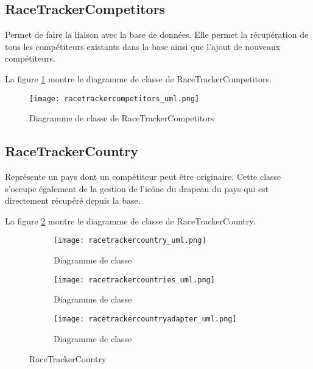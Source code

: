 \subsection{RaceTrackerCompetitors}

Permet de faire la liaison avec la base de données. Elle permet la récupération de tous les compétiteurs existants dans la base ainsi que l'ajout de nouveaux compétiteurs.

La figure \ref{fig:racetrackercompetitors_uml} montre le diagramme de classe de RaceTrackerCompetitors.

\begin{figure}[htb]
\centering 
\texttt{[image: racetrackercompetitors\_uml.png]} 
\caption{Diagramme de classe de RaceTrackerCompetitors}
\label{fig:racetrackercompetitors_uml}
 \end{figure}

\subsection{RaceTrackerCountry}

Représente un pays dont un compétiteur peut être originaire. Cette classe s'occupe également de la gestion de l'icône du drapeau du pays qui est directement récupéré depuis la base.

La figure \ref{fig:racetrackercountry_uml} montre le diagramme de classe de RaceTrackerCountry.

\begin{figure}[htb!]
    \centering
    \begin{subfigure}[htb]{1\textwidth}
		\texttt{[image: racetrackercountry\_uml.png]} 
		\caption{Diagramme de classe}
		\label{fig:racetrackercountry_uml}
    \end{subfigure}
    \begin{subfigure}[htb]{1\textwidth}
		\texttt{[image: racetrackercountries\_uml.png]} 
		\caption{Diagramme de classe}
		\label{fig:racetrackercountries_uml}
    \end{subfigure}
    \begin{subfigure}[htb]{1\textwidth}
		\texttt{[image: racetrackercountryadapter\_uml.png]} 
		\caption{Diagramme de classe}
		\label{fig:racetrackercountryadapter_uml}
    \end{subfigure}
    \caption{RaceTrackerCountry}\label{fig:racetrackercountry_fig}
\end{figure}

